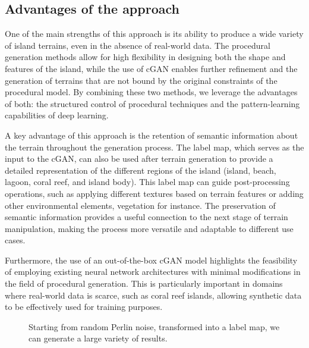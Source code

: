 \subsection{Advantages of the approach}
\label{sec:coral-island-advantages}

One of the main strengths of this approach is its ability to produce a wide variety of island terrains, even in the absence of real-world data. The procedural generation methods allow for high flexibility in designing both the shape and features of the island, while the use of cGAN enables further refinement and the generation of terrains that are not bound by the original constraints of the procedural model. By combining these two methods, we leverage the advantages of both: the structured control of procedural techniques and the pattern-learning capabilities of deep learning.

A key advantage of this approach is the retention of semantic information about the terrain throughout the generation process. The label map, which serves as the input to the cGAN, can also be used after terrain generation to provide a detailed representation of the different regions of the island (island, beach, lagoon, coral reef, and island body). This label map can guide post-processing operations, such as applying different textures based on terrain features or adding other environmental elements, vegetation for instance. The preservation of semantic information provides a useful connection to the next stage of terrain manipulation, making the process more versatile and adaptable to different use cases.

Furthermore, the use of an out-of-the-box cGAN model highlights the feasibility of employing existing neural network architectures with minimal modifications in the field of procedural generation. This is particularly important in domains where real-world data is scarce, such as coral reef islands, allowing synthetic data to be effectively used for training purposes.

\begin{figure}
    \caption{Starting from random Perlin noise, transformed into a label map, we can generate a large variety of results.}
    \label{fig:coral-island-perlin-examples}
\end{figure}

